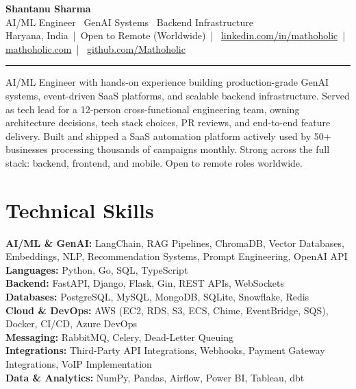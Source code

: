 \documentclass[10pt,a4paper]{article}
\newcommand{\divider}{\vspace{1pt}\noindent\rule{\linewidth}{0.4pt}\vspace{1pt}}
\begin{document}
{\LARGE\bfseries Shantanu Sharma}\\[2pt]
{\large AI/ML Engineer \textbar\ GenAI Systems \textbar\ Backend Infrastructure}\\[3pt]
Haryana, India~|~Open to Remote (Worldwide)~|~%
\href{https://www.linkedin.com/in/mathoholic/}{linkedin.com/in/mathoholic}~|~%
\href{https://mathoholic.com}{mathoholic.com}~|~%
\href{https://github.com/Mathoholic}{github.com/Mathoholic}

\divider

AI/ML Engineer with hands-on experience building production-grade GenAI systems, event-driven SaaS
platforms, and scalable backend infrastructure. Served as tech lead for a 12-person cross-functional
engineering team, owning architecture decisions, tech stack choices, PR reviews, and end-to-end
feature delivery. Built and shipped a SaaS automation platform actively used by 50+
businesses processing thousands of campaigns monthly. Strong across the full stack: backend,
frontend, and mobile. Open to remote roles worldwide.

\section{Technical Skills}

\textbf{AI/ML \& GenAI:} LangChain, RAG Pipelines, ChromaDB, Vector Databases, Embeddings, NLP, Recommendation Systems, Prompt Engineering, OpenAI API \\
\textbf{Languages:} Python, Go, SQL, TypeScript \\
\textbf{Backend:} FastAPI, Django, Flask, Gin, REST APIs, WebSockets \\
\textbf{Databases:} PostgreSQL, MySQL, MongoDB, SQLite, Snowflake, Redis \\
\textbf{Cloud \& DevOps:} AWS (EC2, RDS, S3, ECS, Chime, EventBridge, SQS), Docker, CI/CD, Azure DevOps \\
\textbf{Messaging:} RabbitMQ, Celery, Dead-Letter Queuing \\
\textbf{Integrations:} Third-Party API Integrations, Webhooks, Payment Gateway Integrations, VoIP Implementation \\
\textbf{Data \& Analytics:} NumPy, Pandas, Airflow, Power BI, Tableau, dbt

\end{document}
